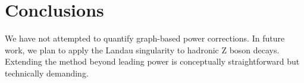 \section{Conclusions}\label{sec:conclusions}

We have not attempted to quantify graph-based power corrections. In
future work, we plan to apply the Landau singularity to hadronic Z boson
decays. Extending the method beyond leading power is conceptually
straightforward but technically demanding.

